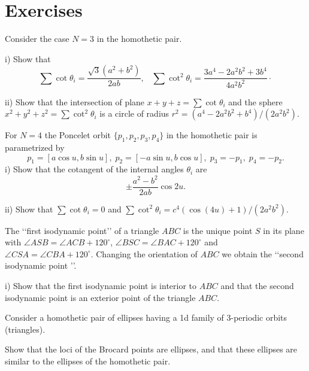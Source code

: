 
\section{Exercises  }
\begin{exercise}
\label{ex:1_chap6} Consider the case   $N=3$ in the homothetic pair.

\noindent i) Show that
\[\sum\cot\theta_i= \frac{\sqrt{3}(a^2 + b^2)}{2ab },\;\;\; \sum\cot^2\theta_i=\frac{3a^4 - 2a^2b^2 + 3b^4}{4a^2b^2}\cdot\]

\noindent ii) Show that the intersection of plane $x+y+z=\sum\cot\theta_i$ and the sphere $x^2+y^2+z^2=\sum\cot^2\theta_i$ is a circle of radius $r^2=(a^4 - 2a^2b^2 + b^4)/(2a^2b^2).$
\end{exercise}
\begin{exercise}
\label{ex:2_chap6}
 For  $N=4 $ the Poncelet orbit $\{p_1,p_2,p_3,p_4\}$ in the homothetic pair is parametrized by
\[p_1=[a\cos u,b\sin u],\; p_2=[-a\sin u, b\cos u], \;p_3=-p_1,\; p_4=-p_2.\]
\noindent i) Show that the cotangent of the internal angles $\theta_i$ are
\[\pm \frac{a^2-b^2}{2ab}\cos 2u.\]

\noindent ii) Show that $\sum\cot\theta_i=0$ and $\sum\cot^2\theta_i=c^4(\cos(4u) + 1)/(2a^2b^2).$

\end{exercise}

\begin{exercise}\label{ex:3_chap6}
The  \lq\lq  first isodynamic point\rq\rq \; of a triangle $ABC$ is the unique point $S$ in its plane with $   \angle ASB = \angle ACB + 120^\circ$, $   \angle BSC = \angle BAC + 120^\circ$   and $\angle CSA = \angle CBA + 120^\circ.$ Changing the orientation of $ABC$ we obtain the \lq\lq second isodynamic point \rq\rq.

\noindent i) Show that the first isodynamic point is interior to $ABC$ and that the  second isodynamic point is an exterior point of the triangle $ABC$.


\end{exercise}

\begin{exercise}\label{ex:4_chap6}
Consider a homothetic pair of ellipses having a 1d family of 3-periodic orbits (triangles).

Show that   the loci of the Brocard points are ellipses, and that these ellipses are similar to the ellipses of the homothetic pair.

\end{exercise}